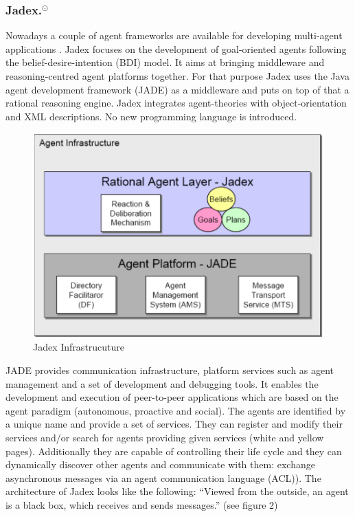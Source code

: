 \subsubsection[Jadex.]{Jadex.$^\odot$}\label{fun:apl_jadex}
Nowadays a couple of agent frameworks are available for developing multi-agent applications \cite{Mangina}.
Jadex focuses on the development of goal-oriented agents following the belief-desire-intention (BDI) model.
It aims at bringing middleware and reasoning-centred agent platforms together.
For that purpose Jadex uses the Java agent development framework (JADE) as a middleware and puts on top of that a rational reasoning engine.
Jadex integrates agent-theories with object-orientation and XML descriptions.
No new programming language is introduced.
\begin{figure}
	\centering
	\includegraphics{images/Jadex_infrastructure.png}
	\caption{Jadex Infrastrucuture}
	\label{fig1}
\end{figure}
JADE provides communication infrastructure, platform services such as agent management and a set of development and debugging tools.
It enables the development and execution of  peer-to-peer applications which are based on the agent paradigm (autonomous, proactive and social).
The agents are identified by a unique name and provide a set of services.
They can register and modify their services and/or search for agents providing given services (white and yellow pages).
Additionally they are capable of controlling their life cycle and they can dynamically discover other agents and communicate with them: exchange asynchronous messages via an agent communication language (ACL)).
The architecture of Jadex looks like the following: "`Viewed from the outside, an agent is a black box, which receives and sends messages."' \cite{Pokahr} (see figure 2)
